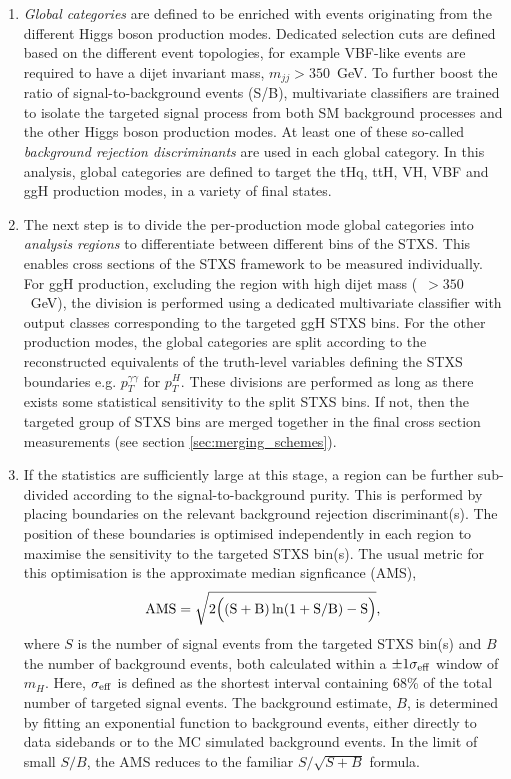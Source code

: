 \begin{enumerate}
    \item \textit{Global categories} are defined to be enriched with events originating from the different Higgs boson production modes. Dedicated selection cuts are defined based on the different event topologies, for example VBF-like events are required to have a dijet invariant mass, $m_{jj}>350$~GeV. To further boost the ratio of signal-to-background events (S/B), multivariate classifiers are trained to isolate the targeted signal process from both SM background processes and the other Higgs boson production modes. At least one of these so-called \textit{background rejection discriminants} are used in each global category. In this analysis, global categories are defined to target the tHq, ttH, VH, VBF and ggH production modes, in a variety of final states.
    
    \item The next step is to divide the per-production mode global categories into \textit{analysis regions} to differentiate between different bins of the STXS. This enables cross sections of the STXS framework to be measured individually. For ggH production, excluding the region with high dijet mass (\mjj~$>350$~GeV), the division is performed using a dedicated multivariate classifier with output classes corresponding to the targeted ggH STXS bins. For the other production modes, the global categories are split according to the reconstructed equivalents of the truth-level variables defining the STXS boundaries e.g. $p_T^{\gamma\gamma}$ for $p_T^H$. These divisions are performed as long as there exists some statistical sensitivity to the split STXS bins. If not, then the targeted group of STXS bins are merged together in the final cross section measurements (see section \ref{sec:merging_schemes}). 
    
    \item If the statistics are sufficiently large at this stage, a region can be further sub-divided according to the signal-to-background purity. This is performed by placing boundaries on the relevant background rejection discriminant(s). The position of these boundaries is optimised independently in each region to maximise the sensitivity to the targeted STXS bin(s). The usual metric for this optimisation is the approximate median signficance (AMS),
    \begin{equation}
        \rm{AMS} = \sqrt{2\Big((S+B)\ln(1+S/B)-S\Big)},
    \end{equation}
    \noindent
    where $S$ is the number of signal events from the targeted STXS bin(s) and $B$ the number of background events, both calculated within a $\pm1\sigma_{\rm{eff}}$ window of $m_H$. Here, $\sigma_{\rm{eff}}$ is defined as the shortest interval containing 68\% of the total number of targeted signal events. The background estimate, $B$, is determined by fitting an exponential function to background events, either directly to data sidebands or to the MC simulated background events. In the limit of small $S/B$, the AMS reduces to the familiar $S/\sqrt{S+B}$ formula.
    

\end{enumerate}
